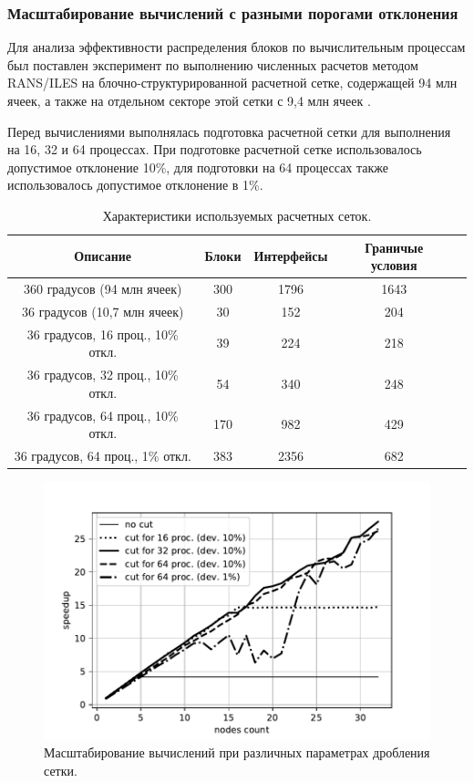 \subsubsection{Масштабирование вычислений с разными порогами отклонения}

Для анализа эффективности распределения блоков по вычислительным процессам был поставлен эксперимент по выполнению численных  расчетов методом RANS/ILES на блочно-структурированной расчетной сетке, содержащей 94 млн ячеек, а также на отдельном секторе этой сетки с 9,4 млн ячеек \cite{Savin2019RANS}.

Перед вычислениями выполнялась подготовка расчетной сетки для выполнения на 16, 32 и 64 процессах.
При подготовке расчетной сетке использовалось допустимое отклонение 10\%, для подготовки на 64 процессах также использовалось допустимое отклонение в 1\%.

\begin{table}[h!]
\centering
\caption{Характеристики используемых расчетных сеток.}
\bigskip
\label{tbl:text_2_withcut}
\begin{tabular}{ | c | c | c | c | c | }
  \hline
  Описание & Блоки & Интерфейсы & Граничые условия \\ \hline\hline
  360 градусов (94 млн ячеек) & 300 & 1796 & 1643 \\ \hline
  36 градусов (10,7 млн ячеек) & 30 & 152 & 204 \\ \hline\hline
  36 градусов, 16 проц., 10\% откл. & 39 & 224 & 218 \\ \hline
  36 градусов, 32 проц., 10\% откл. & 54 & 340 & 248 \\ \hline
  36 градусов, 64 проц., 10\% откл. & 170 & 982 & 429 \\ \hline\hline
  36 градусов, 64 проц., 1\% откл. & 383 & 2356 & 682 \\ \hline
\end{tabular}
\end{table}

\begin{figure}[ht]
	\centering
	\includegraphics[width=1.0\textwidth]{./pics/text_2_withcut/plot_36_scaling_2.pdf}
	\caption{Масштабирование вычислений при различных параметрах дробления сетки.}
	\label{fig:text_2_withcut_scaling2}
\end{figure}
